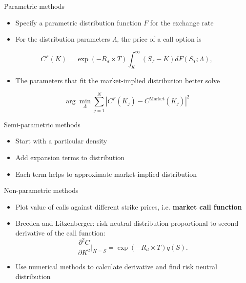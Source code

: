 \begin{frame}{Parametric methods}

\begin{itemize}
\tightlist
\item
  Specify a parametric distribution function \(F\) for the exchange rate
\item
  For the distribution parameters \(\Lambda\), the price of a call
  option is
\end{itemize}

\[
C^F(K) = \exp(-R_d\times T) \int_{K}^{\infty} \left( S_T - K\right) dF(S_T; \Lambda), 
\]

\begin{itemize}
\tightlist
\item
  The parameters that fit the market-implied distribution better solve
\end{itemize}

\[
\arg\min_{\Lambda} \sum_{j=1}^N |C^F(K_j) - C^{\text{Market}}(K_j)|^2
\]

\end{frame}

\begin{frame}{Semi-parametric methods}

\begin{itemize}
\tightlist
\item
  Start with a particular density
\item
  Add expansion terms to distribution
\item
  Each term helps to approximate market-implied distribution
\end{itemize}

\end{frame}

\begin{frame}{Non-parametric methods}

\begin{itemize}
\tightlist
\item
  Plot value of calls against different strike prices, i.e.
  \textbf{market call function}
\item
  Breeden and Litzenberger: risk-neutral distribution proportional to
  second derivative of the call function: \[
  \frac{\partial^2 C}{\partial K^2} \bigg\rvert_{K=S} = \exp(-R_d \times T)q(S).
  \]
\item
  Use numerical methods to calculate derivative and find risk neutral
  distribution
\end{itemize}

\end{frame}

